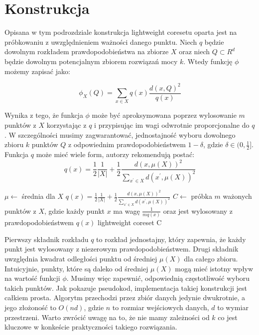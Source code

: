 \section{Konstrukcja}\label{construction}

Opisana w tym podrozdziale konstrukcja lightweight coresetu oparta jest na próbkowaniu z uwzględnieniem ważności danego punktu.
Niech $q$ będzie dowolnym rozkładem prawdopodobieństwa na zbiorze $X$ oraz niech $Q \subset R^{d}$ będzie dowolnym potencjalnym zbiorem rozwiązań mocy $k$. 
Wtedy funkcję $\phi$ możemy zapisać jako:

\begin{equation}
    \phi_{X}(Q) = \sum_{x \in X} q(x) \frac{d(x, Q)^{2}}{q(x)}
\end{equation}

\noindent
Wynika z tego, że funkcja $\phi$ może być aproksymowana poprzez wylosowanie $m$ punktów z $X$ korzystając z $q$ i przypisując im wagi odwrotnie proporcjonalne do $q$.
W szczególności musimy zagwarantować, jednostajność wyboru dowolnego zbioru $k$ punktów $Q$ z odpowiednim prawdopodobieństwem $1 - \delta$, gdzie $\delta \in (0, \frac{1}{2}]$.
Funkcja $q$ może mieć wiele form, autorzy \cite{bachem2017scalable} rekomendują postać:
\begin{equation}
    q(x) = \frac{1}{2}\frac{1}{|X|} + \frac{1}{2}\frac{d(x, \mu(X))^2}{\sum_{x^{'} \in X}d(x^{'}, \mu(X))^2}
\end{equation}

\begin{algorithm}
    \caption{}
\begin{algorithmic}
        \State $\mu \leftarrow$ średnia dla $X$
            \State $q(x) = \frac{1}{2}\frac{1}{|X|} + \frac{1}{2}\frac{d(x, \mu(X))^2}{\sum_{x^{'} \in X}d(x^{'}, \mu(X))^2}$
        \EndFor
        \State $C \leftarrow$ próbka $m$ ważonych punktów z $X$, gdzie każdy punkt $x$ ma wagę $\frac{1}{mq(x)}$ oraz jest wylosowany z prawdopodobieństwem $q(x)$
    \EndProcedure
    \Return lightweight coreset C
\end{algorithmic}
\end{algorithm}

\noindent
Pierwszy składnik rozkładu $q$ to rozkład jednostajny, który zapewnia, że każdy punkt jest wylosowany z niezerowym prawdopodobieństwem.
Drugi składnik uwzględnia kwadrat odległości punktu od średniej $\mu(X)$ dla całego zbioru.
Intuicyjnie, punkty, które są daleko od średniej $\mu(X)$ mogą mieć istotny wpływ na wartość funkcji $\phi$.
Musimy więc zapewnić, odpowiednią częstotliwość wyboru takich punktów. 
Jak pokazuje pseudokod, implementacja takiej konstrukcji jest całkiem prosta.
Algorytm przechodzi przez zbiór danych jedynie dwukrotnie, a jego złożoność to $O(nd)$, gdzie $n$ to rozmiar wejściowych danych, $d$ to wymiar przestrzeni. 
Warto zwrócić uwagę na to, że nie mamy zależności od $k$ co jest kluczowe w konkeście praktyczności takiego rozwiązania.